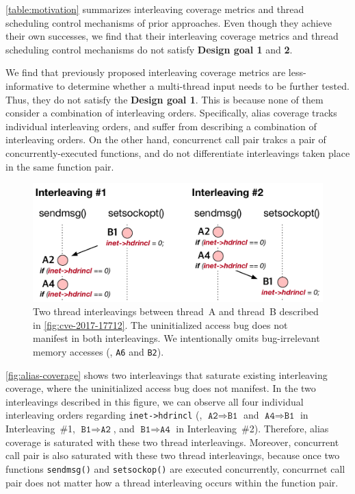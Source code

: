 \autoref{table:motivation} summarizes interleaving coverage metrics and thread scheduling control mechanisms of prior approaches.
%
Even though they achieve their own successes, we find that
their interleaving coverage metrics and thread scheduling control
mechanisms do not satisfy \textbf{Design goal 1} and \textbf{2}.


%
We find that previously proposed interleaving coverage metrics are
less-informative to determine whether a multi-thread input needs to be
further tested. Thus, they do not satisfy the \textbf{Design goal 1}.
%
This is because none of them consider a combination of interleaving
orders. 
%
Specifically, alias coverage tracks individual interleaving orders,
and suffer from describing a combination of interleaving orders.
%
On the other hand, concurrenct call pair trakcs a pair of
concurrently-executed functions, and do not differentiate
interleavings taken place in the same function pair.




\begin{figure}[t]
  \centering
  \includegraphics[width=0.95\linewidth]{fig/alias-coverage.pdf}
  \caption{Two thread interleavings between thread~A and thread~B
    described in \autoref{fig:cve-2017-17712}. The uninitialized
    access bug does not manifest in both interleavings. We
    intentionally omits bug-irrelevant memory accesses (\ie,
    \texttt{A6} and \texttt{B2}).}
  \label{fig:alias-coverage}
\end{figure}


\autoref{fig:alias-coverage} shows two interleavings that saturate
existing interleaving coverage, where the uninitialized access bug
does not manifest.
%
In the two interleavings described in this figure, we can observe all
four individual interleaving orders regarding \texttt{inet->hdrincl}
(\ie, $\texttt{A2} \Rightarrow \texttt{B1}$ and
$\texttt{A4} \Rightarrow \texttt{B1}$ in Interleaving~\#1,
$\texttt{B1} \Rightarrow \texttt{A2}$, and
$\texttt{B1} \Rightarrow \texttt{A4}$ in Interleaving~\#2).
%
Therefore, alias coverage is saturated with these two thread
interleavings.
%
Moreover, concurrent call pair is also saturated with these two thread
interleavings, because once two functions \texttt{sendmsg()} and
\texttt{setsockop()} are executed concurrently, concurrnet call pair
does not matter how a thread interleaving occurs within the function
pair.

